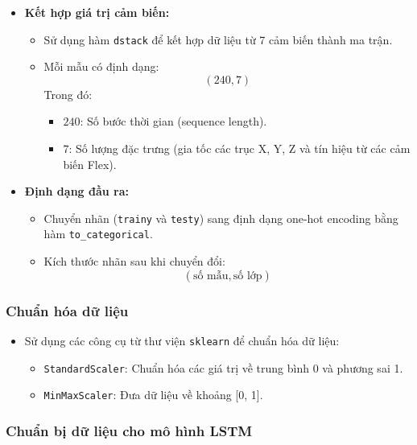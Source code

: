 \begin{itemize}
    \item \textbf{Kết hợp giá trị cảm biến:}
    \begin{itemize}
        \item Sử dụng hàm \texttt{dstack} để kết hợp dữ liệu từ 7 cảm biến thành ma trận.
        \item Mỗi mẫu có định dạng:
        \[
        (240, 7)
        \]
        Trong đó:
        \begin{itemize}
            \item $240$: Số bước thời gian (sequence length).
            \item $7$: Số lượng đặc trưng (gia tốc các trục X, Y, Z và tín hiệu từ các cảm biến Flex).
        \end{itemize}
    \end{itemize}

    \item \textbf{Định dạng đầu ra:}
    \begin{itemize}
        \item Chuyển nhãn (\texttt{trainy} và \texttt{testy}) sang định dạng one-hot encoding bằng hàm \texttt{to\_categorical}.
        \item Kích thước nhãn sau khi chuyển đổi:
        \[
        (\text{số mẫu}, \text{số lớp})
        \]
    \end{itemize}
\end{itemize}

\subsubsection{Chuẩn hóa dữ liệu}

\begin{itemize}
    \item Sử dụng các công cụ từ thư viện \texttt{sklearn} để chuẩn hóa dữ liệu:
    \begin{itemize}
        \item \texttt{StandardScaler}: Chuẩn hóa các giá trị về trung bình 0 và phương sai 1.
        \item \texttt{MinMaxScaler}: Đưa dữ liệu về khoảng [0, 1].
    \end{itemize}
\end{itemize}

\subsubsection{Chuẩn bị dữ liệu cho mô hình LSTM}

